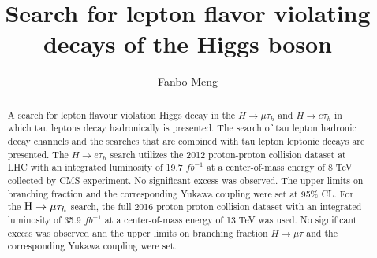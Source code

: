 \documentclass[final,numrefs,sort&compress,noinfo]{nddiss2e}
\begin{document}
 
\frontmatter %

\title{Search for lepton flavor violating decays of the Higgs boson}
\author{Fanbo Meng}

\maketitle
%
%

\makecopyright

\begin{abstract}

A search for lepton flavour violation Higgs decay in the $H \to \mu\tau_{h}$ and $H\to e\tau_{h}$ in which tau leptons decay hadronically is presented. The search of tau lepton hadronic decay channels and the searches that are combined with tau lepton leptonic decays are presented. The $H \to e \tau_{h}$ search utilizes the 2012 proton-proton collision dataset at LHC with an integrated luminosity of 19.7 $fb^{-1}$ at a center-of-mass energy of 8 TeV collected by CMS experiment. No significant excess was observed. The upper limits on branching fraction and the corresponding Yukawa coupling were set at 95\% CL. For the $\mathrm{H}\to \mu\tau_{h}$ search, the full 2016 proton-proton collision dataset with an integrated luminosity of 35.9 $fb^{-1}$ at a center-of-mass energy of 13 TeV was used. No significant excess was observed and the upper limits on branching fraction $H\to \mu\tau$ and the corresponding Yukawa coupling were set. 




\end{abstract}

\end{document}

